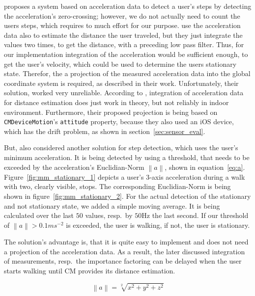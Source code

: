 \citet{wang:wlan} proposes a system based on acceleration data to detect a user's steps by detecting the acceleration's zero-crossing; however, we do not actually need to count the users steps, which requires to much effort for our purpose. \citet{shanklin:embedded_sensors} use the acceleration data also to estimate the distance the user traveled, but they just integrate the values two times, to get the distance, with a preceding low pass filter. Thus, for our implementation integration of the acceleration would be sufficient enough, to get the user's velocity, which could be used to determine the users stationary state. Therefor, the a projection of the measured acceleration data into the global coordinate system is required, as described in their work. Unfortunately, their solution, worked very unreliable. According to \citet{wang:wlan}, integration of acceleration data for distance estimation does just work in theory, but not reliably in indoor environment. Furthermore, their proposed projection is being based on \texttt{CMDeviceMotion}'s \texttt{attitude} property, because they also used an iOS device, which has the drift problem, as shown in section~\ref{sec:sensor_eval}.

But, \citet{shanklin:embedded_sensors} also considered another solution for step detection, which uses the user's minimum acceleration. It is being detected by using a threshold, that needs to be exceeded by the acceleration's Euclidian-Norm $\left\lVert a \right\rVert$, shown in equation~\ref{eq:a}. Figure~\ref{fig:mm_stationary_1} depicts a user's 3-axis acceleration during a walk with two, clearly visible, stops. The corresponding Euclidian-Norm is being shown in figure~\ref{fig:mm_stationary_2}. For the actual detection of the stationary and not stationary state, we added a simple moving average. It is being calculated over the last $50$ values, resp.\ by $50\text{Hz}$ the last second. If our threshold of $\left\lVert a \right\rVert > 0.1 ms^{-2}$ is exceeded, the user is walking, if not, the user is stationary.

The solution's advantage is, that it is quite easy to implement and does not need a projection of the acceleration data. As a result, the later discussed integration of measurements, resp.\ the importance factoring can be delayed when the user starts walking until \acs{CM} provides its distance estimation.
 
\begin{equation} \label{eq:a}
	\left\lVert a \right\rVert = \sqrt[2]{x^{2}+y^{2}+z^{2}}
\end{equation}

